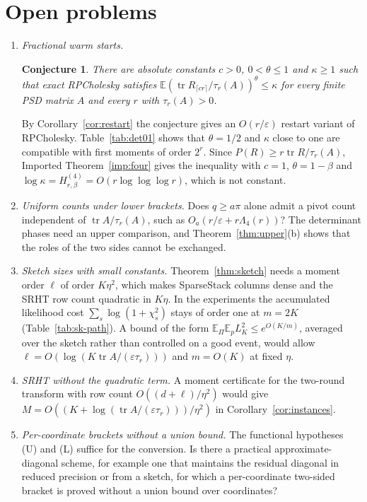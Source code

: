 \documentclass[11pt]{article}
\newtheorem{conjecture}[theorem]{Conjecture}
\theoremstyle{definition}\newtheorem{definition}[theorem]{Definition}
\theoremstyle{remark}\newtheorem{remark}[theorem]{Remark}
\newcommand{\E}{\mathbb E}
\newcommand{\eps}{\varepsilon}
\newcommand{\tr}{\operatorname{tr}}
\newcommand{\1}{\mathbf 1}
\begin{document}
\section{Open problems}\label{sec:open}
\begin{enumerate}[label=\arabic*.,leftmargin=1.6em]
\item \emph{Fractional warm starts.}
\begin{conjecture}\label{conj:warm}
There are absolute constants $c>0$, $0<\theta\le1$ and $\kappa\ge1$ such
that exact RPCholesky satisfies
$\E(\tr R_{\lceil cr\rceil}/\tau_r(A))^\theta\le\kappa$ for every finite
PSD matrix $A$ and every $r$ with $\tau_r(A)>0$.
\end{conjecture}
By Corollary~\ref{cor:restart} the conjecture gives an $O(r/\eps)$
restart variant of RPCholesky. Table~\ref{tab:det01} shows that
$\theta=1/2$ and $\kappa$ close to one are compatible with first
moments of order $2^r$. Since $P(R)\ge r\tr R/\tau_r(A)$, Imported
Theorem~\ref{imp:four} gives the inequality with $c=1$,
$\theta=1-\beta$ and $\log\kappa=H^{(4)}_{r,\beta}=O(r\log\log\log r)$,
which is not constant.

\item \emph{Uniform counts under lower brackets.} Does $q\ge a\pi$ alone
admit a pivot count independent of $\tr A/\tau_r(A)$, such as
$O_a(r/\eps+r\Lambda_4(r))$? The determinant phases need an upper
comparison, and Theorem~\ref{thm:upper}(b) shows that the roles of the
two sides cannot be exchanged.

\item \emph{Sketch sizes with small constants.} Theorem~\ref{thm:sketch}
needs a moment order $\ell$ of order $K\eta^2$, which makes SparseStack
columns dense and the SRHT row count quadratic in $K\eta$. In the
experiments the accumulated likelihood cost
$\sum_s\log(1+\chi^2_s)$ stays of order one at $m=2K$
(Table~\ref{tab:sk-path}). A bound of the form
$\E_\Pi\E_pL_K^2\le e^{O(K/m)}$, averaged over the sketch rather than
controlled on a good event, would allow $\ell=O(\log(K\tr A/(\eps\tau_r)))$
and $m=O(K)$ at fixed $\eta$.

\item \emph{SRHT without the quadratic term.} A moment certificate for
the two-round transform with row count $O((d+\ell)/\eta^2)$ would give
$M=O((K+\log(\tr A/(\eps\tau_r)))/\eta^2)$ in
Corollary~\ref{cor:instances}.

\item \emph{Per-coordinate brackets without a union bound.} The
functional hypotheses (U) and (L) suffice for the conversion. Is there a
practical approximate-diagonal scheme, for example one that maintains
the residual diagonal in reduced precision or from a sketch, for which a
per-coordinate two-sided bracket is proved without a union bound over
coordinates?


\end{enumerate}
\end{document}
